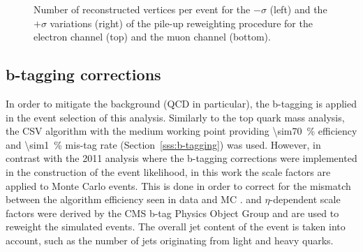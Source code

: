 \begin{figure}[!htpb]
	\caption{\label{fig:pileup_vertices_variations}
    Number of reconstructed vertices per event for the $-\sigma$ (left) and the $+\sigma$ variations (right) of
    the pile-up reweighting procedure for the electron channel (top) and the muon channel (bottom).}
\end{figure}


\subsection{b-tagging corrections}
\label{ss_xsection:btagging_corrections}
In order to mitigate the background (QCD in particular), the b-tagging is applied in the event selection of this
analysis. Similarly to the top quark mass analysis, the CSV algorithm with the medium working point providing
\SI{\sim70}{\percent} efficiency and \SI{\sim1}{\percent} mis-tag rate (Section~\ref{sss:b-tagging}) was used. However,
in contrast with the 2011 analysis where the b-tagging corrections were implemented in the construction of the event
likelihood, in this work the scale factors are applied to Monte Carlo events. This is done in order to correct for the
mismatch between the algorithm efficiency seen in data and MC \autocite{btagging_CMS_8TeV_results}. \pt and
$\eta$-dependent scale factors were derived by the CMS b-tag Physics Object Group \autocite{btag_weights_2011} and are
used to reweight the simulated events. The overall jet content of the event is taken into account, such as the number of
jets originating from light and heavy quarks.


